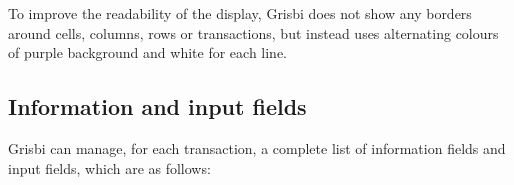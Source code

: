 To improve the readability of the display, Grisbi does not show any borders around cells, columns, rows or transactions, but instead uses alternating colours of \colorbox[RGB]{215,215,255}{purple background} and white for each line.


\subsection{Information and input fields\label{transactions-list-fields}}

Grisbi can manage, for each transaction, a complete list of information fields and input fields, which are as follows:


